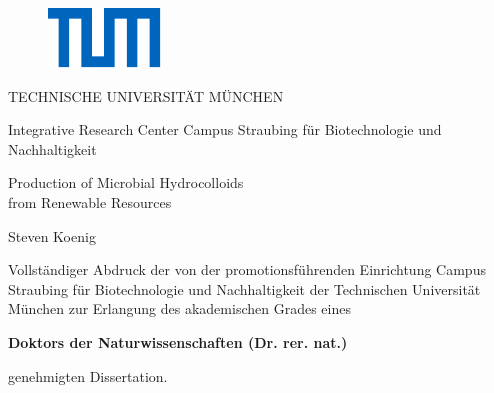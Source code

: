 \begin{titlepage}
	\titlefontii
	\begin{figure}[h]
		\centering
		\includegraphics[scale=2.37]{fig/TUM_Logo.pdf} 
	\end{figure}
	\begin{center}
		\vspace{-0.4mm}
		{\titlefonti \LARGE TECHNISCHE UNIVERSITÄT MÜNCHEN}
		\vspace{1.2mm}
	
		Integrative Research Center Campus Straubing für Biotechnologie und Nachhaltigkeit

		\vspace{25.9mm}
		{
			\titlefonti \fontsize{22pt}{24pt} \selectfont
			\begin{center}
				{Production of Microbial Hydrocolloids\\\vspace{0.3cm} from Renewable Resources}
			\end{center}
			\vspace{0.4mm}
			{\LARGE Steven Koenig}\\
		}

		\vspace{13.7mm}
	\end{center}
	\begin{flushleft}
		\fontsize{11pt}{16.9pt} \selectfont
		Vollständiger Abdruck der von der promotionsführenden Einrichtung Campus Straubing für Biotechnologie und Nachhaltigkeit der Technischen Universität München zur Erlangung des akademischen Grades eines
	\end{flushleft}
	\begin{center}
		\vspace{7.9mm}
		\textbf{Doktors der Naturwissenschaften (Dr. rer. nat.)}
	\end{center}
	\vspace{0.6cm}
	\begin{flushleft}
		genehmigten Dissertation.
	\end{flushleft}				
	\vspace{1.2cm}
	

\end{titlepage}
